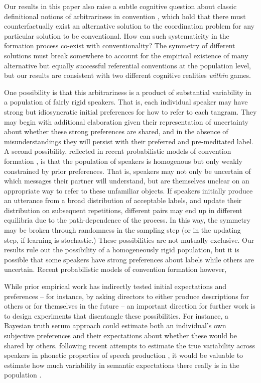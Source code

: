\documentclass[alpha-refs]{wiley-article}
\begin{document}
Our results in this paper also raise a subtle cognitive question about classic definitional notions of arbitrariness in convention \citep{Lewis69_Convention}, which hold that there must counterfactually exist an alternative solution to the coordination problem for any particular solution to be conventional.
How can such systematicity in the formation process co-exist with conventionality?
The symmetry of different solutions must break somewhere to account for the empirical existence of many alternative but equally successful referential conventions at the population level, but our results are consistent with two different cognitive realities \emph{within} games.

One possibility is that this arbitrariness is a product of substantial variability in a population of fairly rigid speakers.
That is, each individual speaker may have strong but idiosyncratic initial preferences for how to refer to each tangram. 
They may begin with additional elaboration given their representation of uncertainty about whether these strong preferences are shared, and in the absence of misunderstandings they will persist with their preferred and pre-meditated label.
A second possibility, reflected in recent probabilistic models of convention formation \cite{smith_learning_2013,hawkins_convention-formation_2017,Brochagen17}, is that the population of speakers is homogenous but only weakly constrained by prior preferences. 
That is, speakers may not only be uncertain of which messages their partner will understand, but are themselves unclear on an appropriate way to refer to these unfamiliar objects.
If speakers initially produce an utterance from a broad distribution of acceptable labels, and update their distribution on subsequent repetitions, different pairs may end up in different equilibria due to the path-dependence of the process. 
In this way, the symmetry may be broken through randomness in the sampling step (or in the updating step, if learning is stochastic.)
These possibilities are not mutually exclusive.
Our results rule out the possibility of a homogeneously rigid population, but it is possible that some speakers have strong preferences about labels while others are uncertain. Recent probabilistic models of convention formation however, 

While prior empirical work has indirectly tested initial expectations and  preferences -- for instance, by asking directors to either produce descriptions for others or for themselves in the future \citep{FussellKrauss89_IntendedAudienceCommonGround} -- an important direction for further work is to design experiments that disentangle these possibilities.
For instance, a Bayesian truth serum approach \citep{prelec2004bayesian} could estimate both an individual's own subjective preferences and their expectations about whether these would be shared by others.
 following recent attempts to estimate the true variability across speakers in phonetic properties of speech production \citep{kleinschmidt2019structure}, it would be valuable to estimate how much variability in semantic expectations there really is in the population \citep{FurnasEtAl87_VocabularyProblem}.
 
\end{document}
